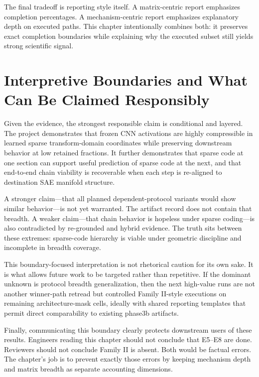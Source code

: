 \documentclass[11pt]{article}
\begin{document}
The final tradeoff is reporting style itself. A matrix-centric report emphasizes completion percentages. A mechanism-centric report emphasizes explanatory depth on executed paths. This chapter intentionally combines both: it preserves exact completion boundaries while explaining why the executed subset still yields strong scientific signal.

\section{Interpretive Boundaries and What Can Be Claimed Responsibly}
Given the evidence, the strongest responsible claim is conditional and layered. The project demonstrates that frozen CNN activations are highly compressible in learned sparse transform-domain coordinates while preserving downstream behavior at low retained fractions. It further demonstrates that sparse code at one section can support useful prediction of sparse code at the next, and that end-to-end chain viability is recoverable when each step is re-aligned to destination SAE manifold structure.

A stronger claim---that all planned dependent-protocol variants would show similar behavior---is not yet warranted. The artifact record does not contain that breadth. A weaker claim---that chain behavior is hopeless under sparse coding---is also contradicted by re-grounded and hybrid evidence. The truth sits between these extremes: sparse-code hierarchy is viable under geometric discipline and incomplete in breadth coverage.

This boundary-focused interpretation is not rhetorical caution for its own sake. It is what allows future work to be targeted rather than repetitive. If the dominant unknown is protocol breadth generalization, then the next high-value runs are not another winner-path retread but controlled Family II-style executions on remaining architecture-mask cells, ideally with shared reporting templates that permit direct comparability to existing phase3b artifacts.

Finally, communicating this boundary clearly protects downstream users of these results. Engineers reading this chapter should not conclude that E5--E8 are done. Reviewers should not conclude Family II is absent. Both would be factual errors. The chapter's job is to prevent exactly those errors by keeping mechanism depth and matrix breadth as separate accounting dimensions.

\appendix
\end{document}
